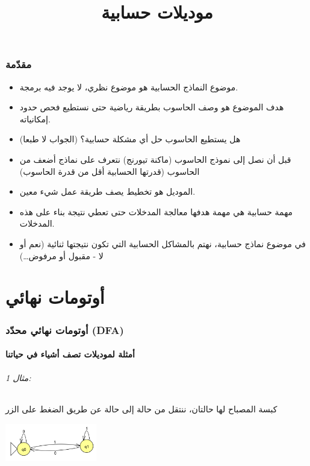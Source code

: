 ﻿\documentclass[12pt]{article}
\title{موديلات حسابية}
\begin{document}
\maketitle

\renewcommand{\contentsname}{جدول المحتويات}
\tableofcontents
\clearpage

\section{مقدّمة}

\begin{itemize}
    \item موضوع النماذج الحسابية هو موضوع نظري، لا يوجد فيه برمجة.
    \item هدف الموضوع هو وصف الحاسوب بطريقة رياضية حتى نستطيع فحص حدود إمكانياته.
    \item هل يستطيع الحاسوب حل أي مشكلة حسابية؟ (الجواب لا طبعا)
    \item قبل أن نصل إلى نموذج الحاسوب (ماكنة تيورنج) نتعرف على نماذج أضعف من الحاسوب (قدرتها الحسابية أقل من قدرة الحاسوب)
    \item الموديل هو تخطيط يصف طريقة عمل شيء معين.
    \item مهمة حسابية هي مهمة هدفها معالجة المدخلات حتى تعطي نتيجة بناء على هذه المدخلات.
    \item في موضوع نماذج حسابية، نهتم بالمشاكل الحسابية التي تكون نتيجتها ثنائية (نعم أو لا - مقبول أو مرفوض\ldots)
\end{itemize}

\clearpage
\part{أوتومات نهائي}
\section{أوتومات نهائي محدّد (DFA)}

\subsection{أمثلة لموديلات تصف أشياء في حياتنا}

\paragraph{مثال 1:} كبسة المصباح لها حالتان، ننتقل من حالة إلى حالة عن طريق الضغط على الزر
\begin{center}
\includegraphics[width=0.3\textwidth]{../../../images/DFAs/01_lamp_dfa.png}
\end{center}
\end{document}
